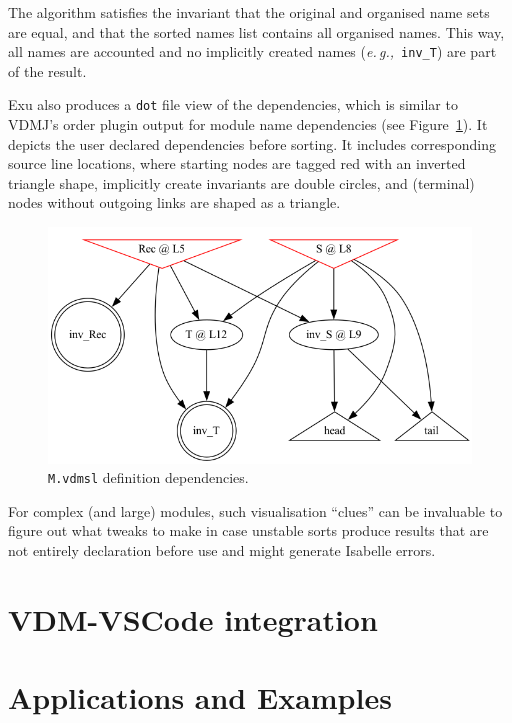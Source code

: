 \documentclass[runningheads,a4paper]{llncs}
\newcommand{\eg}{{\em e.\,g.,\/}}
\begin{document}
The algorithm satisfies the invariant that the original and organised name sets are equal, and that the sorted names list contains all organised names. This way, all names are accounted and no implicitly created names (\eg~\verb'inv_T') are part of the result.     

Exu also produces a \texttt{dot} file view of the dependencies, which is similar to VDMJ's order plugin output for module name dependencies (see Figure~\ref{fig:Mdot}). It depicts the user declared dependencies before sorting. It includes corresponding source line locations, where starting nodes are tagged red with an inverted triangle shape, implicitly create invariants are double circles, and (terminal) nodes without outgoing links are shaped as a triangle.  
%
\begin{figure}[htbp]
    \centering
        \includegraphics[width=\textwidth,scale=0.4]{figures/M.png}
    \caption{\texttt{M.vdmsl} definition dependencies.}\label{fig:Mdot}
 \end{figure}
%
For complex (and large) modules, such visualisation ``clues'' can be invaluable to figure out what tweaks to make in case unstable sorts produce results that are not entirely declaration before use and might generate Isabelle errors. 

\section{VDM-VSCode integration}\label{sec:integration}

\section{Applications and Examples}\label{sec:Examples}
\end{document}
